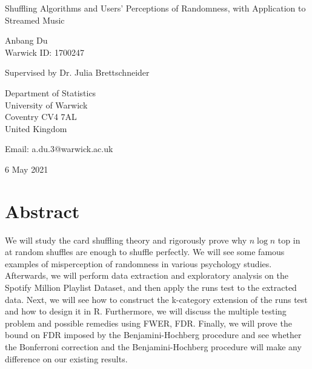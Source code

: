 \documentclass[12pt]{article}
\theoremstyle{plain}
\theoremstyle{definition}
\theoremstyle{remark}
\begin{document}
\thispagestyle{empty}
\begin{center}
{\Huge Shuffling Algorithms and Users’ Perceptions of Randomness, with Application to Streamed Music

\bigskip
\bigskip


\bigskip
\bigskip

\huge Anbang Du\\
\vspace{5pt}
\huge Warwick ID: 1700247\\
\bigskip
\bigskip
\bigskip


\LARGE Supervised by Dr. Julia Brettschneider}
\end{center}
\vfill

\begin{center}
{\Large
Department of Statistics\\
University of Warwick\\
Coventry CV4 7AL\\
United Kingdom\\
\medskip

Email: a.du.3@warwick.ac.uk \\
\medskip

6 May 2021 }
\end{center}
\bigskip

\newpage

\hfill

\hfill

\hfill

\hfill

\section*{Abstract}
We will study the card shuffling theory and rigorously prove why $n\log n$ top in at random shuffles are enough to shuffle perfectly. We will see some famous examples of misperception of randomness in various psychology studies. Afterwards, we will perform data extraction and exploratory analysis on the Spotify Million Playlist Dataset, and then apply the runs test to the extracted data. Next, we will see how to construct the k-category extension of the runs test and how to design it in R. Furthermore, we will discuss the multiple testing problem and possible remedies using FWER, FDR. Finally, we will prove the bound on FDR imposed by the Benjamini-Hochberg procedure and see whether the Bonferroni correction and the Benjamini-Hochberg procedure will make any difference on our existing results.
\end{document}
